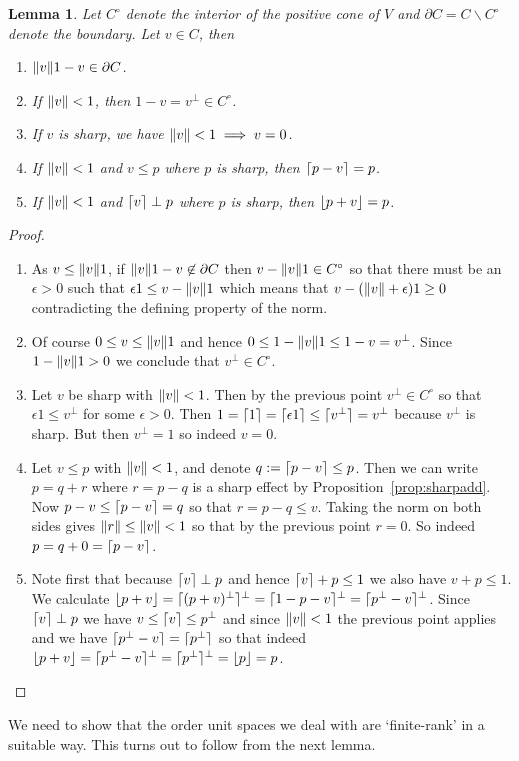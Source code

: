 \documentclass[a4paper,onecolumn,10pt,accepted=2019-05-03, issue=1, volume=1, shorttitle=papers/compositionality-1-1]{compositionalityarticle}
\DeclarePairedDelimiter{\ceil}{\lceil}{\rceil}
\DeclarePairedDelimiter{\floor}{\lfloor}{\rfloor}
\newcounter{counter}
\numberwithin{counter}{section}
\newtheorem{lemma}[counter]{Lemma}
\begin{document}
\begin{lemma} \label{lem:var}
	Let $C^\circ$ denote the interior of the positive cone of $V$ and $\partial C = C\backslash C^\circ$ denote the boundary. Let $v\in C$, then 
		\begin{enumerate}
			\item $\norm{v}1 - v \in \partial C$.
			\item If $\norm{v}<1$, then $1-v=v^\perp \in C^\circ$.
			\item If $v$ is sharp, we have $\norm{v}<1 \implies v=0$.
			\item If $\norm{v}<1$ and $v\leq p$ where $p$ is sharp, then $\ceil{p-v}=p$.
            \item If $\norm{v}<1$ and $\ceil{v}\perp p$ where $p$ is sharp, then $\floor{p+v} = p$.
		\end{enumerate}
\end{lemma}
\begin{proof} ~
	\begin{enumerate}
	\item As $v\leq \norm{v}1$, if $\norm{v}1-v \not\in\partial C$ then $v-\norm{v}1\in C^\circ$ so that there must be an $\epsilon>0$ such that $\epsilon 1 \leq v-\norm{v}1$ which means that $v-(\norm{v}+\epsilon)1 \geq 0$ contradicting the defining property of the norm. 
	\item Of course $0\leq v\leq \norm{v}1$ and hence $0\leq 1-\norm{v}1 \leq 1-v=v^\perp$. Since $1-\norm{v}1>0$ we conclude that $v^\perp \in C^\circ$.
	\item Let $v$ be sharp with $\norm{v}<1$. Then by the previous point $v^\perp \in C^\circ$ so that $\epsilon 1\leq v^\perp$ for some $\epsilon>0$. Then $1=\ceil{1}=\ceil{\epsilon 1} \leq \ceil{v^\perp} = v^\perp$ because $v^\perp$ is sharp. But then $v^\perp = 1$ so indeed $v=0$.
	\item Let $v\leq p$ with $\norm{v}<1$, and denote $q:=\ceil{p-v}\leq p$. Then we can write $p=q+r$ where $r=p-q$ is a sharp effect by Proposition~\ref{prop:sharpadd}. Now $p-v\leq \ceil{p-v}=q$ so that $r=p-q\leq v$. Taking the norm on both sides gives $\norm{r} \leq \norm{v}<1$ so that by the previous point $r=0$. So indeed $p=q+0 = \ceil{p-v}$.
    \item Note first that because $\ceil{v}\perp p$ and hence $\ceil{v}+p\leq 1$ we also have $v+p\leq 1$. We calculate $\floor{p+v} = \ceil{(p+v)^\perp}^\perp = \ceil{1-p-v}^\perp = \ceil{p^\perp - v}^\perp$. Since $\ceil{v}\perp p$ we have $v\leq \ceil{v}\leq p^\perp$ and since $\norm{v}<1$ the previous point applies and we have $\ceil{p^\perp - v} = \ceil{p^\perp}$ so that indeed $\floor{p+v} = \ceil{p^\perp -v}^\perp = \ceil{p^\perp}^\perp = \floor{p}=p$. \qedhere
	\end{enumerate}
\end{proof}
We need to show that the order unit spaces we deal with are `finite-rank' in a suitable way. This turns out to follow from the next lemma.
\end{document}
